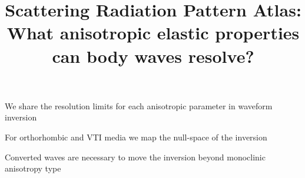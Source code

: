 \documentclass[draft]{agujournal2018}
\begin{document}
\title{Scattering Radiation Pattern Atlas: What anisotropic elastic properties can body waves resolve?}








\begin{keypoints}
	\item We share the resolution limits for each anisotropic parameter in waveform inversion
	\item For orthorhombic and VTI media we map the null-space of the inversion
	\item Converted waves are necessary to move the inversion beyond monoclinic anisotropy type
\end{keypoints}





	



	













\end{document}
